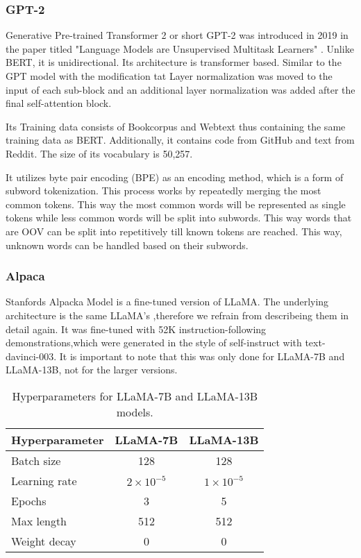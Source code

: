 \subsubsection{GPT-2}
Generative Pre-trained Transformer 2 or short GPT-2 was introduced in 2019 in the paper titled "Language Models are Unsupervised Multitask Learners"\cite{Radford2019LanguageMA} . Unlike BERT, it is unidirectional. Its architecture is transformer based. Similar to the GPT model with the modification tat Layer normalization was moved to the input of each sub-block and an additional layer normalization was added after the final self-attention block\cite{Radford2019LanguageMA}.

Its Training data consists of Bookcorpus and Webtext thus containing the same training data as BERT. Additionally, it contains code from GitHub and text from Reddit.
The size of its vocabulary is 50,257\cite{Radford2019LanguageMA}.

It utilizes byte pair encoding (BPE) as an encoding method, which is a form of subword tokenization. This process works by repeatedly merging the most common tokens. 
This way the most common words will be represented as single tokens while less common words will be split into subwords. This way words that are OOV can be split into repetitively till known tokens are reached. This way, unknown words can be handled based on their subwords.


 


\subsubsection{Alpaca} 
Stanfords Alpacka Model is a fine-tuned version of LLaMA. The underlying architecture is the same LLaMA's ,therefore we refrain from describeing them in detail again. It was fine-tuned with 52K instruction-following demonstrations,which were generated in the style of self-instruct \cite{wang2023selfinstruct} with text-davinci-003. It is important to note that this was only done for LLaMA-7B and LLaMA-13B, not for the larger versions.




\begin{table}[ht]
\centering
\begin{tabular}{|l|c|c|}
\hline
\textbf{Hyperparameter} & \textbf{LLaMA-7B} & \textbf{LLaMA-13B} \\
\hline
Batch size & 128 & 128 \\
Learning rate & $2 \times 10^{-5}$ & $1 \times 10^{-5}$ \\
Epochs & 3 & 5 \\
Max length & 512 & 512 \\
Weight decay & 0 & 0 \\
\hline
\end{tabular}
\caption{Hyperparameters for LLaMA-7B and LLaMA-13B models.\cite{alpaca}}
\label{tab:hyperparameters}
\end{table}




